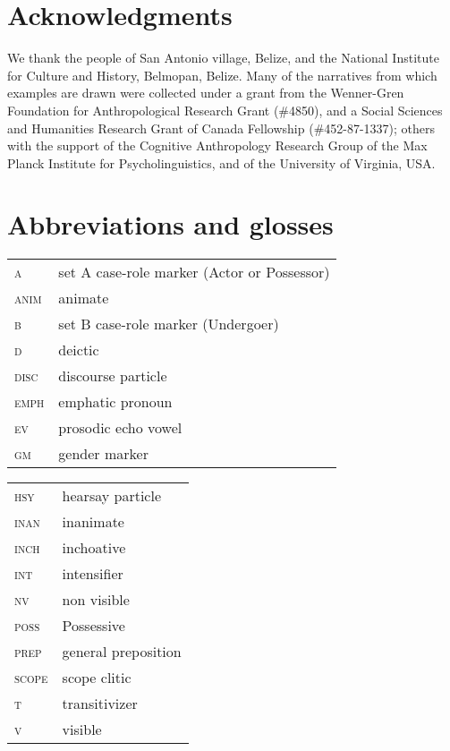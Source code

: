 \documentclass[output=paper]{langsci/langscibook}
\begin{document}
\section*{Acknowledgments}
We thank the people of San Antonio village, Belize, and the National Institute for Culture and History, Belmopan, Belize. Many of the narratives from which examples are drawn were collected under a grant from the Wenner-Gren Foundation for Anthropological Research Grant (\#4850), and a Social Sciences and Humanities Research Grant of Canada Fellowship (\#452-87-1337); others with the support of the Cognitive Anthropology Research Group of the Max Planck Institute for Psycholinguistics, and of the University of Virginia, USA. 


\section*{Abbreviations and glosses}

\begin{tabularx}{.45\textwidth}{lQ}
{\textsc{a}} & set A case-role marker (Actor or Possessor) \\
{\textsc{anim}} & animate					  \\
{\textsc{b}} & set B case-role marker (Undergoer)		  \\
{\textsc{d}} & deictic 						  \\
{\textsc{disc}} & discourse particle 				  \\
{\textsc{emph}} & emphatic pronoun 				  \\
{\textsc{ev}} & prosodic echo vowel 				  \\
{\textsc{gm}} & gender marker 					  \\
\end{tabularx}
\begin{tabularx}{.45\textwidth}{lQ}
{\textsc{hsy}} & hearsay particle	                   \\
{\textsc{inan}} & inanimate\\
{\textsc{inch}} & inchoative \\
{\textsc{int}} & intensifier	\\
{\textsc{nv}} & non visible	\\
{\textsc{poss}} & Possessive	\\
{\textsc{prep}} & general preposition	\\
{\textsc{scope}} & scope clitic 	\\
{\textsc{t}} & transitivizer	\\
{\textsc{v}} & visible
\end{tabularx}


{\sloppy\printbibliography[heading=subbibliography,notkeyword=this]}
\end{document}
